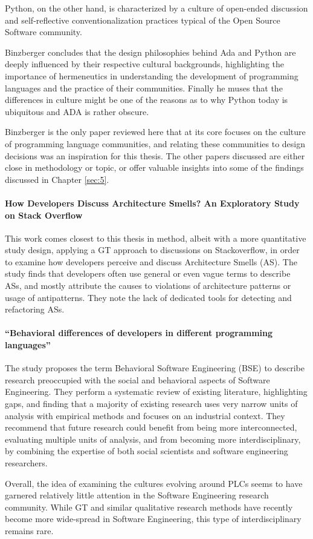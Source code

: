 Python, on the other hand, is characterized by a culture of open-ended discussion and self-reflective conventionalization
practices typical of the Open Source Software community.

Binzberger concludes that the design philosophies behind Ada and Python are deeply influenced by their respective cultural
backgrounds, highlighting the importance of hermeneutics in understanding the development of programming languages and
the practice of their communities. Finally he muses that the differences in culture might be one of the reasons as to
why Python today is ubiquitous and ADA is rather obscure.

Binzberger is the only paper reviewed here that at its core focuses on the culture of programming language communities,
and relating these communities to design decisions was an inspiration for this thesis. The other papers discussed are
either close in methodology or topic, or offer valuable insights into some of the findings discussed in Chapter \ref{sec:5}.

\paragraph*{How Developers Discuss Architecture Smells? An Exploratory Study on Stack Overflow \cite{tian_how_2019}}

This work comes closest to this thesis in method, albeit with a more quantitative study design, applying a GT approach to
discussions on Stackoverflow, in order to examine how developers perceive and discuss Architecture Smells (AS).
The study finds that developers often use general or even vague terms to describe ASs, and mostly attribute the causes
to violations of architecture patterns or usage of antipatterns. They note the lack of dedicated tools for detecting and
refactoring ASs.

\paragraph*{“Behavioral differences of developers in different programming languages” \cite{lenberg_behavioral_2015}}

The study proposes the term Behavioral Software Engineering (BSE) to describe research preoccupied with the social and
behavioral aspects of Software Engineering. They perform a systematic review of existing literature, highlighting gaps,
and finding that a majority of existing research uses very narrow units of analysis with empirical methods and focuses
on an industrial context. They recommend that future research could benefit  from being more interconnected, evaluating
multiple units of analysis, and from becoming more interdisciplinary, by combining the expertise of both social scientists
and software engineering researchers.

Overall, the idea of examining the cultures evolving around PLCs seems to have garnered relatively little attention
in the Software Engineering research community. While GT and similar qualitative research methods have recently become more
wide-spread in Software Engineering, this type of interdisciplinary remains rare. \cite{lenberg_behavioral_2015}
